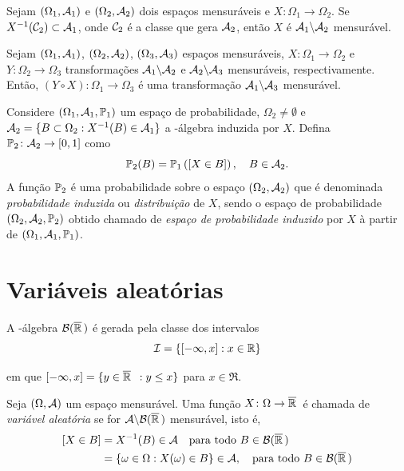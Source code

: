 \begin{theorem}
	Sejam $(\Omega_1, \Acal_1)$ e $(\Omega_2, \Acal_2)$ dois espaços mensuráveis e $X\colon \Omega_1\to\Omega_2$. Se $X\inv(\Ccal_2) \subset \Acal_1$, onde $\Ccal_2$ é a classe que gera $\Acal_2$, então $X$ é $\Acal_1\backslash\Acal_2$ mensurável.
\end{theorem}

\begin{theorem}
	Sejam $(\Omega_1, \Acal_1)$, $(\Omega_2, \Acal_2)$, $(\Omega_3, \Acal_3)$ espaços mensuráveis, $X\colon\Omega_1\to\Omega_2$ e $Y\colon\Omega_2\to\Omega_3$ transformações $\Acal_1\backslash\Acal_2$ e $\Acal_2\backslash\Acal_3$ mensuráveis, respectivamente. Então, $(Y\circ X)\colon \Omega_1 \to \Omega_3$ é uma transformação $\Acal_1\backslash\Acal_3$ mensurável.
\end{theorem}

\begin{theorem}
	Considere $(\Omega_1, \Acal_1, \P_1)$ um espaço de probabilidade, $\Omega_2 \neq \emptyset$ e   $\Acal_2 = \{ B \subset \Omega_2: X\inv(B) \in \Acal_1 \}$ a \sig-álgebra induzida por $X$. Defina $\P_2\colon\Acal_2 \to [0,1]$ como
	\begin{equation}
		\P_2(B) = 	\P_1\left([X \in B]\right), \quad B \in \Acal_2.
	\end{equation}
	A função $\P_2$ é uma probabilidade sobre o espaço $(\Omega_2, \Acal_2)$ que é denominada \textit{probabilidade induzida} ou \textit{distribuição} de $X$, sendo o espaço de probabilidade $(\Omega_2, \Acal_2, \P_2)$ obtido chamado de \textit{espaço de probabilidade induzido} por $X$ à partir de $(\Omega_1, \Acal_1, \P_1)$.
\end{theorem}

\section{Variáveis aleatórias}

\begin{lemma}
	A \sig-álgebra $\Boe$ é gerada pela classe dos intervalos
	\[
		\Ical = \{[-\infty,x] : x \in \Re\}
	\]
\end{lemma}
%
em que \([-\infty,x] = \{y \in \Ree\ : y \leq x\}\) para $x\in\Re$.


\begin{definition}
	Seja $(\Omega, \Acal)$ um espaço mensurável. Uma função $X\colon\Omega \to \Ree$ é chamada de \textit{variável aleatória} se for $\Acal\backslash\Boe$ mensurável, isto é,
	\begin{equation}
		\begin{aligned}
			[X\in B] &= X\inv(B) \in \Acal \quad \text{para todo } B \in \Boe \\
					 &= \{\omega \in \Omega: X(\omega) \in B \}  \in \Acal,  \quad \text{para todo } B \in \Boe
		\end{aligned}
	\end{equation}
\end{definition}

